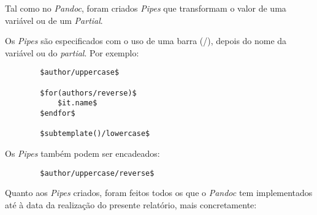 \documentclass[../relatorio.tex]{subfiles}
\begin{document}
    Tal como no \textit{Pandoc}, foram criados \textit{Pipes}
    que transformam o valor de uma variável ou de um \textit{Partial}.

    Os \textit{Pipes} são especificados com o uso de uma barra (/), 
    depois do nome da variável ou do \textit{partial}. Por exemplo:

    \begin{verbatim}
        $author/uppercase$

        $for(authors/reverse)$
            $it.name$
        $endfor$

        $subtemplate()/lowercase$
    \end{verbatim}

    Os \textit{Pipes} também podem ser encadeados:
    \begin{verbatim}
        $author/uppercase/reverse$
    \end{verbatim}
    
    Quanto aos \textit{Pipes} criados, foram feitos todos os que o
    \textit{Pandoc} tem implementados até à data da realização
    do presente relatório, mais concretamente:
\end{document}
